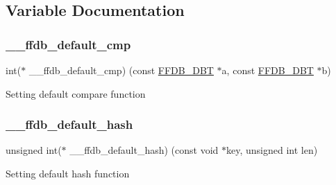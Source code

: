 \subsection{Variable Documentation}
\mbox{\label{adat-devel_2other__libs_2filedb_2filehash_2ffdb__hash__func_8h_a95a05878af50da44152ad314a956b048}} 
\subsubsection{\texorpdfstring{\_\_ffdb\_default\_cmp}{\_\_ffdb\_default\_cmp}}
{\footnotesize\ttfamily int($\ast$ \+\_\+\+\_\+ffdb\+\_\+default\+\_\+cmp) (const \mbox{\hyperlink{adat-devel_2other__libs_2filedb_2filehash_2ffdb__db_8h_aa2e0984399491df0fdd20898ca8758f9}{F\+F\+D\+B\+\_\+\+D\+BT}} $\ast$a, const \mbox{\hyperlink{adat-devel_2other__libs_2filedb_2filehash_2ffdb__db_8h_aa2e0984399491df0fdd20898ca8758f9}{F\+F\+D\+B\+\_\+\+D\+BT}} $\ast$b)}

Setting default compare function \mbox{\label{adat-devel_2other__libs_2filedb_2filehash_2ffdb__hash__func_8h_a8dbb63e1cad3f3b74feb88774094ac90}} 
\subsubsection{\texorpdfstring{\_\_ffdb\_default\_hash}{\_\_ffdb\_default\_hash}}
{\footnotesize\ttfamily unsigned int($\ast$ \+\_\+\+\_\+ffdb\+\_\+default\+\_\+hash) (const void $\ast$key, unsigned int len)}

Setting default hash function 